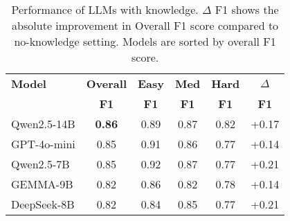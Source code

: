 \begin{table}[h]
\footnotesize  %
\centering
\setlength{\tabcolsep}{4pt}  %
\begin{tabular}{l|c|ccc|c}
\hline
\textbf{Model} & \textbf{Overall} & \textbf{Easy} & \textbf{Med} & \textbf{Hard} & $\Delta$ \\
& \textbf{F1} & \textbf{F1} & \textbf{F1} & \textbf{F1} & \textbf{F1} \\
\hline
Qwen2.5-14B & \textbf{0.86} & 0.89 & 0.87 & 0.82 & +0.17 \\
GPT-4o-mini & 0.85 & 0.91 & 0.86 & 0.77 & +0.14 \\
Qwen2.5-7B & 0.85 & 0.92 & 0.87 & 0.77 & +0.21 \\
GEMMA-9B & 0.82 & 0.86 & 0.82 & 0.78 & +0.14 \\
DeepSeek-8B & 0.82 & 0.84 & 0.85 & 0.77 & +0.21 \\
\hline
\end{tabular}
\caption{Performance of LLMs with knowledge. $\Delta$ F1 shows the absolute improvement in Overall F1 score compared to no-knowledge setting. Models are sorted by overall F1 score.}
\label{tab:llm_performance_with}
\end{table}